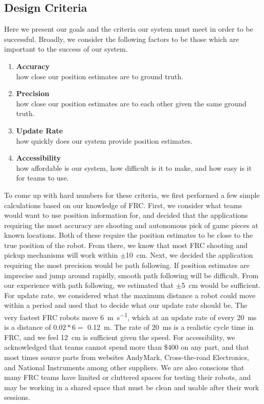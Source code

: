 \documentclass{article}
\begin{document}
  \subsection{Design Criteria}

    Here we present our goals and the criteria our system must meet in order to be successful. Broadly, we consider the following factors to be those which are important to the success of our system.
    \begin{enumerate}
      \item \textbf{Accuracy}\\ how close our position estimates are to ground truth.
      \item \textbf{Precision}\\ how close our position estimates are to each other given the same ground truth.
      \item \textbf{Update Rate}\\ how quickly does our system provide position estimates.
      \item \textbf{Accessibility}\\ how affordable is our system, how difficult is it to make, and how easy is it for teams to use.
    \end{enumerate}

    To come up with hard numbers for these criteria, we first performed a few simple calculations based on our knowledge of FRC. First, we consider what teams would want to use position information for, and decided that the applications requiring the most accuracy are shooting and autonomous pick of game pieces at known locations. Both of these require the position estimates to be close to the true position of the robot. From there, we know that most FRC shooting and pickup mechanisms will work within $\pm$\SI{10}{\centi\meter}. Next, we decided the application requiring the most precision would be path following. If position estimates are imprecise and jump around rapidly, smooth path following will be difficult. From our experience with path following, we estimated that $\pm$\SI{5}{\centi\meter} would be sufficient. For update rate, we considered what the maximum distance a robot could move within a period and used that to decide what our update rate should be. The very fastest FRC robots move \SI{6}{\meter\per\second}, which at an update rate of every \SI{20}{\milli\second} is a distance of $0.02*6 =$ \SI{0.12}{\meter}. The rate of \SI{20}{\milli\second} is a realistic cycle time in FRC, and we feel \SI{12}{\centi\meter} is sufficient given the speed. For accessibility, we acknowledged that teams cannot spend more than \$400 on any part, and that most times source parts from websites AndyMark, Cross-the-road Electronics, and National Instruments among other suppliers. We are also conscious that many FRC teams have limited or cluttered spaces for testing their robots, and may be working in a shared space that must be clean and usable after their work sessions.
\end{document}
